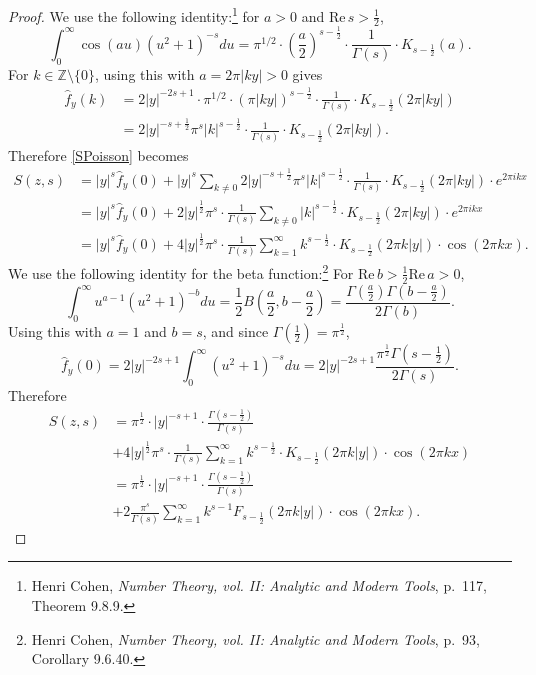\documentclass{article}
\def\Re{\ensuremath{\mathrm{Re}}\,}
\theoremstyle{definition}
\theoremstyle{definition}
\begin{document}
\begin{proof}
We use the following identity:\footnote{Henri Cohen, {\em Number Theory, vol. II: Analytic and Modern Tools}, p.~117, Theorem 9.8.9.}
for $a>0$ and $\Re s>\frac{1}{2}$,
\[
\int_0^\infty \cos(au) (u^2+1)^{-s} du = \pi^{1/2} \cdot \left(\frac{a}{2}\right)^{s-\frac{1}{2}} \cdot \frac{1}{\Gamma(s)} \cdot
K_{s-\frac{1}{2}}(a).
\]
For $k \in \mathbb{Z} \setminus \{0\}$, 
using this with  $a=2\pi |k y|>0$ gives
\begin{align*}
\widehat{f}_y(k) &= 2|y|^{-2s+1} \cdot \pi^{1/2} \cdot ( \pi |k y|)^{s-\frac{1}{2}} \cdot \frac{1}{\Gamma(s)} \cdot K_{s-\frac{1}{2}}(2\pi |k y|)\\
&=2|y|^{-s+\frac{1}{2}} \pi^s |k|^{s-\frac{1}{2}} \cdot \frac{1}{\Gamma(s)} \cdot K_{s-\frac{1}{2}}(2\pi |k y|).
\end{align*}
Therefore \eqref{SPoisson} becomes
\begin{align*}
S(z,s) &= |y|^s\widehat{f}_y(0) + |y|^s \sum_{k \neq 0} 
2|y|^{-s+\frac{1}{2}} \pi^s |k|^{s-\frac{1}{2}} \cdot \frac{1}{\Gamma(s)} \cdot K_{s-\frac{1}{2}}(2\pi |k y|)
\cdot e^{2\pi ikx}\\
&=|y|^s \widehat{f}_y(0) + 2|y|^{\frac{1}{2}} \pi^s \cdot \frac{1}{\Gamma(s)}
\sum_{k \neq 0} |k|^{s-\frac{1}{2}} \cdot K_{s-\frac{1}{2}}(2\pi |k y|)
\cdot e^{2\pi ikx}\\
&=|y|^s \widehat{f}_y(0) + 4|y|^{\frac{1}{2}} \pi^s \cdot \frac{1}{\Gamma(s)} \sum_{k=1}^\infty k^{s-\frac{1}{2}} \cdot K_{s-\frac{1}{2}}(2\pi k |y|)
\cdot \cos(2\pi kx).
\end{align*}
We use the following identity for the beta function:\footnote{Henri Cohen, {\em Number Theory, vol. II: Analytic and Modern Tools}, p.~93, Corollary
9.6.40.}
For $\Re b>\frac{1}{2}\Re a>0$, 
\[
\int_0^\infty u^{a-1} (u^2+1)^{-b} du = \frac{1}{2}B\left(\frac{a}{2},b-\frac{a}{2}\right)
=\frac{\Gamma\left(\frac{a}{2}\right) \Gamma\left(b-\frac{a}{2}\right)}{2\Gamma(b)}.
\]
Using this with $a=1$ and $b=s$, and since $\Gamma\left(\frac{1}{2}\right)=\pi^{\frac{1}{2}}$,
\[
\widehat{f}_y(0)=2|y|^{-2s+1} \int_0^\infty (u^2+1)^{-s} du
=2|y|^{-2s+1} \frac{\pi^{\frac{1}{2}} \Gamma\left(s-\frac{1}{2}\right)}{2\Gamma(s)}.
\]
Therefore
\begin{align*}
S(z,s)&=\pi^{\frac{1}{2}} \cdot |y|^{-s+1} \cdot  \frac{ \Gamma\left(s-\frac{1}{2}\right)}{\Gamma(s)}\\
&
+ 4|y|^{\frac{1}{2}} \pi^s \cdot \frac{1}{\Gamma(s)} \sum_{k=1}^\infty k^{s-\frac{1}{2}} \cdot K_{s-\frac{1}{2}}(2\pi k |y|)
\cdot \cos(2\pi kx)\\
&=\pi^{\frac{1}{2}} \cdot |y|^{-s+1} \cdot  \frac{ \Gamma\left(s-\frac{1}{2}\right)}{\Gamma(s)}\\
&+2 \frac{\pi^s}{\Gamma(s)} \sum_{k=1}^\infty k^{s-1} F_{s-\frac{1}{2}}(2\pi k|y|) \cdot \cos(2\pi kx).
\end{align*}


\end{proof}
\end{document}
